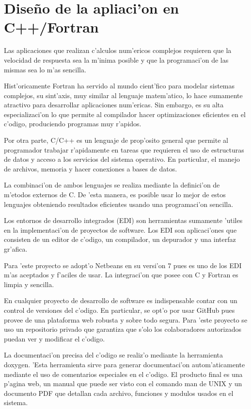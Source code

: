 \section{Dise\~no de la apliaci'on en C++/Fortran}
  Las aplicaciones que realizan c'alculos num'ericos complejos requieren que la velocidad de respuesta sea la m'inima posible y que
  la programaci'on de las mismas sea lo m'as sencilla.

  Hist'oricamente Fortran ha servido al mundo cient'fico para modelar sistemas complejos, su sint'axis, 
  muy similar al lenguaje matem'atico, lo hace sumamente atractivo para desarrollar aplicaciones num'ericas. Sin embargo,
  es su alta especializaci'on lo que permite al compilador hacer optimizaciones eficientes en el c'odigo, produciendo
  programas muy r'apidos.

  Por otra parte, C/C++ es un lenguaje de prop'osito general que permite al programador trabajar r'apidamente en tareas que requieren
  el uso de estructuras de datos y acceso a los servicios del sistema operativo. 
  En particular, el manejo de archivos, memoria y hacer conexiones a bases de datos.

  La combinaci'on de ambos lenguajes se realiza mediante la definici'on de m'etodos externos de C. De 'esta manera, es posible
  usar lo mejor de estos lenguajes obteniendo resultados eficientes usando una programaci'on sencilla.


  Los entornos de desarrollo integrados (EDI) son herramientas sumamente 'utiles en la implementaci'on de proyectos de software.
  Los EDI son aplicaci'ones que consisten de un editor de c'odigo, un compilador, un depurador y una interfaz gr'afica.

  Para 'este proyecto se adopt'o Netbeans en su versi'on 7 pues es uno de los EDI m'as aceptados y f'aciles de usar. La integraci'on
  que posee con C y Fortran es limpia y sencilla.

  En cualquier proyecto de desarrollo de software es indispensable contar con un control de versiones del c'odigo. En particular,
  se opt'o por usar GitHub pues provee de una plataforma web robusta y sobre todo segura. Para 'este proyecto se uso un repositorio
  privado que garantiza que s'olo los colaboradores autorizados puedan ver y modificar el c'odigo.

  La documentaci'on precisa del c'odigo se realiz'o mediante la herramienta doxygen. 'Esta herramienta sirve para generar
  documentaci'on autom'aticamente mediante el uso de comentarios especiales en el c'odigo. El producto final es una p'agina web, un manual 
  que puede ser visto con el comando man de UNIX y un documento PDF que detallan cada archivo, funciones y modulos usados en el sistema.
  

